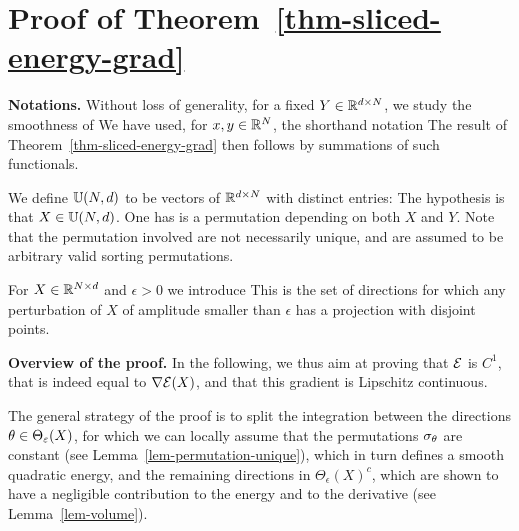 \section{Proof of Theorem~\ref{thm-sliced-energy-grad}}
\label{sec-proof-thm-sliced}


\noindent\textbf{Notations.}  
Without loss of generality, for a fixed $Y \in \mathbb{R}^{d \times N}$, we study the smoothness of 
We have used, for $x, y \in \mathbb{R}^N$, the shorthand notation
The result of Theorem~\ref{thm-sliced-energy-grad} then follows by summations of such functionals. 

We define $\mathbb{U}(N,d)$ to be vectors of $\mathbb{R}^{d \times N}$ with distinct entries:
The hypothesis is that $X \in \mathbb{U}(N,d)$. 
One has 
is a permutation depending on both $X$ and $Y$. Note that the permutation involved are not necessarily unique, and are assumed to be arbitrary valid sorting permutations.

For $X \in \mathbb{R}^{N \times d}$ and $\epsilon>0$ we introduce 
This is the set of directions for which any perturbation of $X$ of amplitude smaller than $\epsilon$ has a projection with disjoint points. 

\medskip
\noindent\textbf{Overview of the proof.}  
In the following, we thus aim at proving that $\mathcal{E}$ is $C^1$, that
is indeed equal to $\nabla \mathcal{E}(X)$, and that this gradient is Lipschitz continuous. 

The general strategy of the proof is to split the integration between the directions $\theta \in \Theta_\varepsilon(X)$, for which we can locally assume that the permutations $\sigma_\theta$ are constant (see Lemma~\ref{lem-permutation-unique}), which in turn defines a smooth quadratic energy, and the remaining directions in $\Theta_\epsilon(X)^c$, which are shown to have a negligible contribution to the energy and to the derivative (see Lemma~\ref{lem-volume}). 

